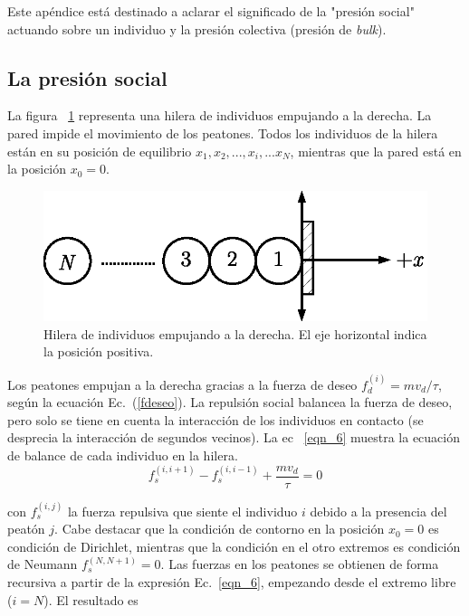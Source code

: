 \label{appendix:presion}

Este apéndice está destinado a aclarar el significado de la "presión social" actuando sobre un individuo y la presión colectiva (presión de \textit{bulk}).  
\\
\subsection{\label{social_pressure}La presión social}

La figura ~\ref{hilera2} representa una hilera de individuos empujando a la derecha. La pared impide el movimiento de los peatones. Todos los individuos de la hilera están en su posición de equilibrio $x_1,x_2,...,x_{i},...x_N$, mientras que la pared está en la posición $x_0=0$. 

\begin{figure}[!htbp]
\center
\includegraphics[scale=1]{figuras/hilera.eps}
\caption{\label{hilera2} Hilera de individuos empujando a la derecha. El eje horizontal indica la posición positiva. }
\end{figure}

Los peatones empujan a la derecha gracias a la fuerza de deseo
$f_d^{(i)}=mv_d/\tau$, según la ecuación Ec.~(\ref{fdeseo}). La repulsión social balancea la fuerza de deseo, pero solo se tiene en cuenta la interacción de los individuos en contacto (se desprecia la interacción de segundos vecinos). La ec ~\ref{eqn_6} muestra la ecuación de balance de cada individuo en la hilera. \\

\begin{equation}
 f_s^{(i,i+1)}-f_s^{(i,i-1)}+\displaystyle\frac{mv_d}{\tau}=0\label{eqn_6}
\end{equation}

\noindent con $f_s^{(i,j)}$ la fuerza repulsiva que siente el individuo $i$ debido a la presencia del peatón $j$. Cabe destacar que la condición de contorno en la posición $x_0=0$  es condición de Dirichlet, mientras que la condición en el otro extremos es condición de Neumann $f_s^{(N,N+1)}=0$. Las fuerzas en los peatones se obtienen de forma recursiva a partir de la expresión Ec.~\ref{eqn_6}, empezando desde el extremo libre ($i=N$). El resultado es

